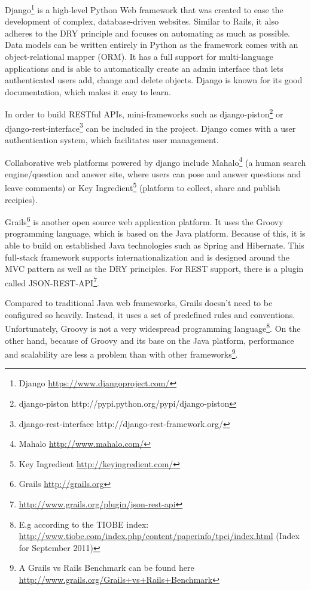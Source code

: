 Django\footnote{Django \url{https://www.djangoproject.com/}} is a high-level Python Web framework that was created to ease the development of complex, database-driven websites. Similar to Rails, it also adheres to the DRY principle and focuses on automating as much as possible. Data models can be written entirely in Python as the framework comes with an object-relational mapper (ORM). It has a full support for multi-language applications and is able to automatically create an admin interface that lets authenticated users add, change and delete objects. Django is known for its good documentation, which makes it easy to learn.

In order to build RESTful APIs, mini-frameworks such as django-piston\footnote{django-piston http://pypi.python.org/pypi/django-piston} or django-rest-interface\footnote{django-rest-interface http://django-rest-framework.org/} can be included in the project. Django comes with a user authentication system, which facilitates user management. 

Collaborative web platforms powered by django include Mahalo\footnote{Mahalo \url{http://www.mahalo.com/}} (a human search engine/question and answer site, where users can pose and answer questions and leave comments) or Key Ingredient\footnote{Key Ingredient \url{http://keyingredient.com/}} (platform to collect, share and publish recipies).   

Grails\footnote{Grails \url{http://grails.org}} is another open source web application platform. It uses the Groovy programming language, which is based on the Java platform. Because of this, it is able to build on established Java technologies such as Spring and Hibernate. This full-stack framework supports internationalization and is designed around the MVC pattern as well as the DRY principles.
For REST support, there is a plugin called JSON-REST-API\footnote{\url{http://www.grails.org/plugin/json-rest-api}}.

Compared to traditional Java web frameworks, Grails doesn't need to be configured so heavily. Instead, it uses a set of predefined rules and conventions. Unfortunately, Groovy is not a very widespread programming language\footnote{E.g according to the TIOBE index: \url{http://www.tiobe.com/index.php/content/paperinfo/tpci/index.html} (Index for September 2011)}. On the other hand, because of Groovy and its base on the Java platform, performance and scalability are less a problem than with other frameworks\footnote{A Grails vs Rails Benchmark can be found here \url{http://www.grails.org/Grails+vs+Rails+Benchmark}}. 

